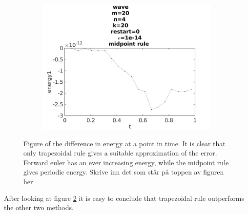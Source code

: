 \begin{figure}[H]
        \begin{subfigure}[b]{0.30\textwidth}
                \includegraphics[width=\textwidth]{../MATLAB/fig/energyovertimemidpoint.jpg}
                \caption{  }
                \label{fig:errormid}
        \end{subfigure}
        \caption{Figure of the difference in energy at a point in time. It is clear that only trapezoidal rule gives a suitable approximation of the error. Forward euler has an ever increasing energy, while the midpoint rule gives periodic energy.  Skrive inn det som står på toppen av figuren her}
        \label{fig:energy}
\end{figure}
After looking at figure \ref{fig:energy} it is easy to conclude that trapezoidal rule outperforms the other two methods.
